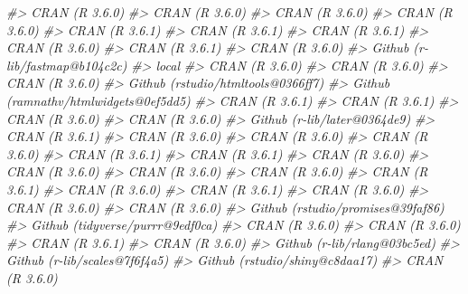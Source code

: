 \documentclass[
  12pt,
]{krantz}
\newenvironment{Shaded}{\begin{snugshade}}{\end{snugshade}}
\newcommand{\CommentTok}[1]{\textcolor[rgb]{0.56,0.35,0.01}{\textit{#1}}}
\begin{document}
\begin{Shaded}
\begin{Highlighting}[]
\CommentTok{#>  CRAN (R 3.6.0)                       }
\CommentTok{#>  CRAN (R 3.6.0)                       }
\CommentTok{#>  CRAN (R 3.6.0)                       }
\CommentTok{#>  CRAN (R 3.6.0)                       }
\CommentTok{#>  CRAN (R 3.6.1)                       }
\CommentTok{#>  CRAN (R 3.6.1)                       }
\CommentTok{#>  CRAN (R 3.6.1)                       }
\CommentTok{#>  CRAN (R 3.6.0)                       }
\CommentTok{#>  CRAN (R 3.6.1)                       }
\CommentTok{#>  CRAN (R 3.6.0)                       }
\CommentTok{#>  Github (r-lib/fastmap@b104c2c)       }
\CommentTok{#>  local                                }
\CommentTok{#>  CRAN (R 3.6.0)                       }
\CommentTok{#>  CRAN (R 3.6.0)                       }
\CommentTok{#>  CRAN (R 3.6.0)                       }
\CommentTok{#>  Github (rstudio/htmltools@0366ff7)   }
\CommentTok{#>  Github (ramnathv/htmlwidgets@0ef5dd5)}
\CommentTok{#>  CRAN (R 3.6.1)                       }
\CommentTok{#>  CRAN (R 3.6.1)                       }
\CommentTok{#>  CRAN (R 3.6.0)                       }
\CommentTok{#>  CRAN (R 3.6.0)                       }
\CommentTok{#>  Github (r-lib/later@0364de9)         }
\CommentTok{#>  CRAN (R 3.6.1)                       }
\CommentTok{#>  CRAN (R 3.6.0)                       }
\CommentTok{#>  CRAN (R 3.6.0)                       }
\CommentTok{#>  CRAN (R 3.6.0)                       }
\CommentTok{#>  CRAN (R 3.6.1)                       }
\CommentTok{#>  CRAN (R 3.6.1)                       }
\CommentTok{#>  CRAN (R 3.6.0)                       }
\CommentTok{#>  CRAN (R 3.6.0)                       }
\CommentTok{#>  CRAN (R 3.6.0)                       }
\CommentTok{#>  CRAN (R 3.6.0)                       }
\CommentTok{#>  CRAN (R 3.6.1)                       }
\CommentTok{#>  CRAN (R 3.6.0)                       }
\CommentTok{#>  CRAN (R 3.6.1)                       }
\CommentTok{#>  CRAN (R 3.6.0)                       }
\CommentTok{#>  CRAN (R 3.6.0)                       }
\CommentTok{#>  CRAN (R 3.6.0)                       }
\CommentTok{#>  Github (rstudio/promises@39faf86)    }
\CommentTok{#>  Github (tidyverse/purrr@9edf0ca)     }
\CommentTok{#>  CRAN (R 3.6.0)                       }
\CommentTok{#>  CRAN (R 3.6.0)                       }
\CommentTok{#>  CRAN (R 3.6.1)                       }
\CommentTok{#>  CRAN (R 3.6.0)                       }
\CommentTok{#>  Github (r-lib/rlang@03bc5ed)         }
\CommentTok{#>  Github (r-lib/scales@7f6f4a5)        }
\CommentTok{#>  Github (rstudio/shiny@c8daa17)       }
\CommentTok{#>  CRAN (R 3.6.0)                       }

\end{Highlighting}
\end{Shaded}
\end{document}
